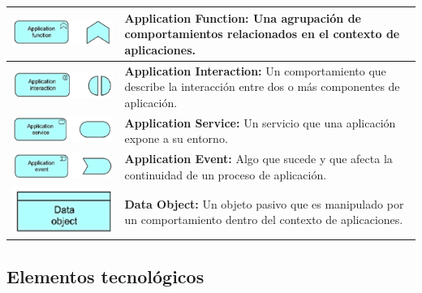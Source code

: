 \begin{longtable}{|c|p{8cm}|}
\hline
\includegraphics{anexos/ARCHI/application/function.png} & 
\textbf{Application Function:} Una agrupación de comportamientos relacionados en el contexto de aplicaciones. \\
\hline
\includegraphics{anexos/ARCHI/application/interaction.png} & 
\textbf{Application Interaction:} Un comportamiento que describe la interacción entre dos o más componentes de aplicación. \\
\hline
\includegraphics{anexos/ARCHI/application/service.png} & 
\textbf{Application Service:} Un servicio que una aplicación expone a su entorno. \\
\hline
\includegraphics{anexos/ARCHI/application/event.png} & 
\textbf{Application Event:} Algo que sucede y que afecta la continuidad de un proceso de aplicación. \\
\hline
\includegraphics{anexos/ARCHI/application/object.png} & 
\textbf{Data Object:} Un objeto pasivo que es manipulado por un comportamiento dentro del contexto de aplicaciones. \\
\hline
\end{longtable}

\subsection{Elementos tecnológicos}

